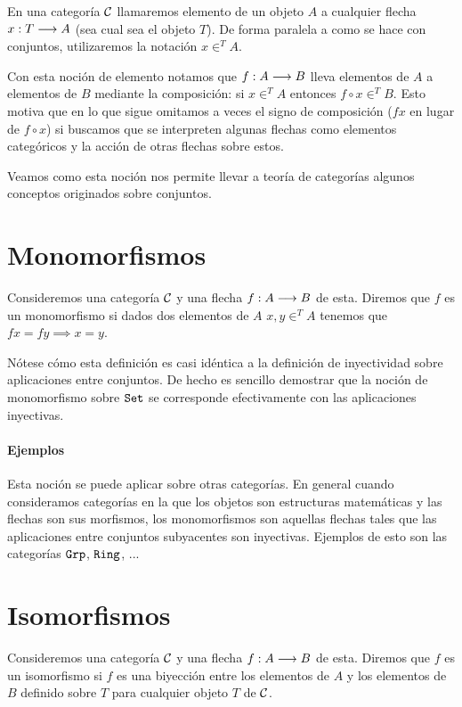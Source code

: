 \begin{definition}
En una categoría $\mathcal{C}$ llamaremos elemento de un objeto $A$
a cualquier flecha $x : T\longrightarrow A$ (sea cual sea el objeto
$T$). De forma paralela a como se hace con conjuntos, utilizaremos
la notación $x \in^T A$.
\end{definition}

Con esta noción de elemento notamos que $f : A\longrightarrow B$ lleva
elementos de $A$ a elementos de $B$ mediante la composición: si
$x \in^T A$ entonces $f \circ x \in^T B$. Esto motiva que en lo que
sigue omitamos a veces el signo de composición ($f x$ en lugar
de $f \circ x$) si buscamos que se interpreten algunas flechas
como elementos categóricos y la acción de otras flechas sobre estos.

Veamos como esta noción nos permite llevar a teoría de categorías
algunos conceptos originados sobre conjuntos.

\section{Monomorfismos}
\begin{definition}
Consideremos una categoría $\mathcal{C}$ y una flecha $f : A\longrightarrow B$ de esta.
Diremos que $f$ es un monomorfismo si dados dos elementos de $A$
$x, y \in^T A$ tenemos que $fx = fy \implies x = y$.
\end{definition}

Nótese cómo esta definición es casi idéntica a la definición de
inyectividad sobre aplicaciones entre conjuntos. De hecho es sencillo
demostrar que la noción de monomorfismo sobre $\texttt{Set}$ se corresponde
efectivamente con las aplicaciones inyectivas.


\paragraph{Ejemplos}
Esta noción se puede aplicar sobre otras categorías. En general
cuando consideramos categorías en la que los objetos son estructuras
matemáticas y las flechas son sus morfismos, los monomorfismos son
aquellas flechas tales que las aplicaciones entre conjuntos subyacentes
son inyectivas. Ejemplos de esto son las categorías
$\texttt{Grp}$, $\texttt{Ring}$, ...

\section{Isomorfismos}
\begin{definition}
Consideremos una categoría $\mathcal{C}$ y una flecha $f : A\longrightarrow B$ de
esta. Diremos que $f$ es un isomorfismo si $f$ es una biyección
entre los elementos de $A$ y los elementos de $B$ definido sobre
$T$ para cualquier objeto $T$ de $\mathcal{C}$.
\end{definition}

